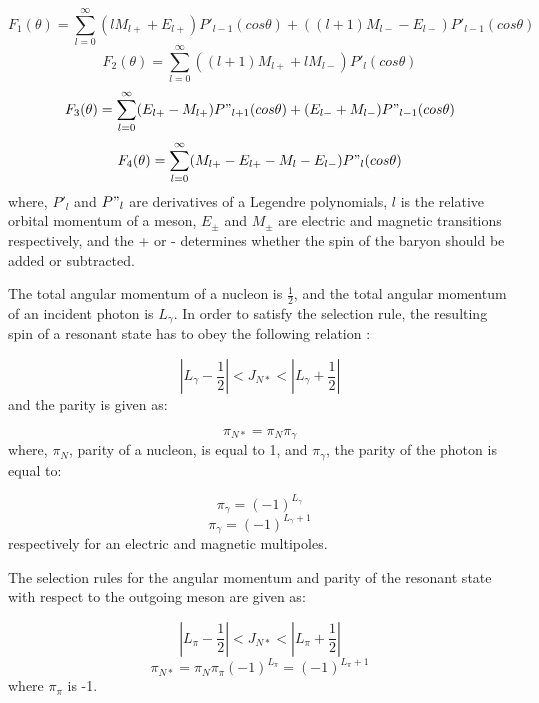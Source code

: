 \begin{equation}
F_{1}(\theta)=\sum\limits_{l=0}^{\infty} (lM_{l+}+E_{l+})P'_{l-1}(cos\theta)+((l+1)M_{l-}-E_{l-})P'_{l-1}(cos\theta)
\end{equation}
\begin{equation}
F_{2}(\theta)=\sum\limits_{l=0}^{\infty} ((l+1)M_{l+}+lM_{l-})P'_{l}(cos\theta)
\end{equation}
\begin{equation}
F_{3}(\theta)=\sum\limits_{l=0}^{\infty} (E_{l+}-M_{l+})P"_{l+1}(cos\theta)+(E_{l-}+M_{l-})P"_{l-1}(cos\theta)
\end{equation}
\begin{equation}
F_{4}(\theta)=\sum\limits_{l=0}^{\infty} (M_{l+}-E_{l+}-M_{l}-E_{l-})P"_{l}(cos\theta)
\end{equation}
where, $P'_{l}$ and $P"_{l}$ are derivatives of a Legendre polynomials, $l$ is the relative orbital momentum of a meson, $E_{\pm}$ and $M_{\pm}$ are electric and magnetic transitions respectively, and the + or - determines whether the spin of the baryon should be added or subtracted.

\indent The total angular momentum of a nucleon is $\frac{1}{2}$, and the total angular momentum of an incident photon is $L_{\gamma}$. In order to satisfy the selection rule, the resulting spin of a resonant state has to obey the following relation \cite{krusche}:

\begin{equation}
\left|L_{\gamma}-\frac{1}{2}\right|<J_{N*}<\left|L_{\gamma}+\frac{1}{2}\right|
\end{equation}
and the parity is given as:

\begin{equation}
\pi_{N*}=\pi_{N}\pi_{\gamma}
\end{equation}
where, $\pi_{N}$, parity of a nucleon, is equal to 1, and $\pi_{\gamma}$, the parity of the photon is equal to:

\begin{equation}
\pi_{\gamma}=(-1)^{L_{\gamma}}
\end{equation}
\begin{equation}
\pi_{\gamma}=(-1)^{L_{\gamma}+1}
\end{equation}
respectively for an electric and magnetic multipoles.

\indent The selection rules for the angular momentum and parity of the resonant state with respect to the outgoing meson are given as:

\begin{equation}
\left|L_{\pi}-\frac{1}{2}\right|<J_{N*}<\left|L_{\pi}+\frac{1}{2}\right|
\end{equation}
\begin{equation}
\pi_{N*}=\pi_{N}\pi_{\pi}(-1)^{L_{\pi}}=(-1)^{L_{\pi}+1}
\end{equation}
where $\pi_{\pi}$ is -1.

